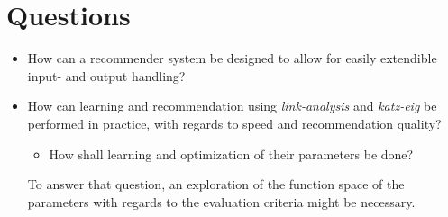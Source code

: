 
\section{Questions}\label{sec:intro:questions}


\begin{itemize}

    \item How can a recommender system be designed to allow for easily extendible input- and output handling?


    \item How can learning and recommendation using \textit{link-analysis} and \textit{katz-eig} be performed in practice, with regards to speed and recommendation quality?

        \begin{itemize}
            \item How shall learning and optimization of their parameters be done?
        \end{itemize}

        To answer that question, an exploration of the function space of the parameters with regards to the evaluation criteria might be necessary.








\end{itemize}
